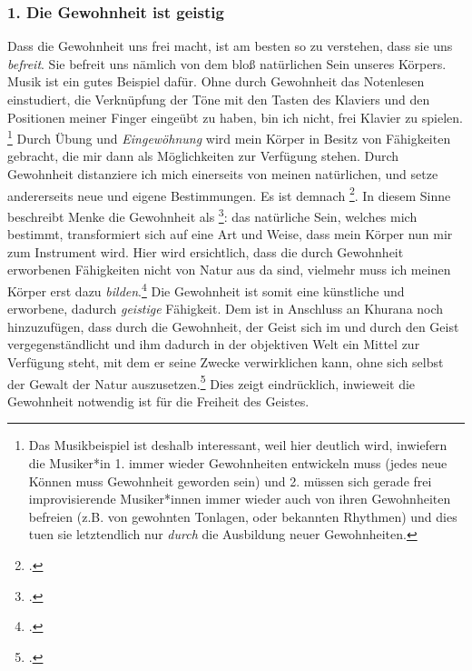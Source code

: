 \documentclass[12pt, a4paper, openany]{report}
\begin{document}
\subsubsection{1. Die Gewohnheit ist geistig}
Dass die Gewohnheit uns frei macht, ist am besten so zu verstehen, dass sie uns \emph{befreit}. 
Sie befreit uns nämlich von dem bloß natürlichen Sein unseres Körpers.
Musik ist ein gutes Beispiel dafür. 
Ohne durch Gewohnheit das Notenlesen einstudiert, die Verknüpfung der Töne mit den Tasten des Klaviers und den Positionen meiner Finger eingeübt zu haben, bin ich nicht, frei Klavier zu spielen.%
\footnote{
    Das Musikbeispiel ist deshalb interessant, weil hier deutlich wird, inwiefern die Musiker*in 1. immer wieder Gewohnheiten entwickeln muss (jedes neue Können muss Gewohnheit geworden sein) und 2. müssen sich gerade frei improvisierende Musiker*innen immer wieder auch von ihren Gewohnheiten befreien (z.B. von gewohnten Tonlagen, oder bekannten Rhythmen) und dies tuen sie letztendlich nur \emph{durch} die Ausbildung neuer Gewohnheiten.
}
Durch Übung und \emph{Eingewöhnung} wird mein Körper in Besitz von Fähigkeiten gebracht, die mir dann als Möglichkeiten zur Verfügung stehen.
Durch Gewohnheit distanziere ich mich einerseits von meinen natürlichen, und setze andererseits neue und eigene Bestimmungen. 
Es ist demnach \footcite[][§ 410 A, S. 185]{hegel_enzyklopädie_1969}.
In diesem Sinne beschreibt Menke die Gewohnheit als \footcite[][130]{menke_autonomie_2018}:
das natürliche Sein, welches mich bestimmt, transformiert sich auf eine Art und Weise, dass mein Körper nun mir zum Instrument wird.
Hier wird ersichtlich, dass die durch Gewohnheit erworbenen Fähigkeiten nicht von Natur aus da sind, vielmehr muss ich meinen Körper erst dazu \emph{bilden}.\footcite[Vgl.][§ 410 Z, S. 190]{hegel_enzyklopädie_1969}
Die Gewohnheit ist somit eine künstliche und erworbene, dadurch \emph{geistige} Fähigkeit.
Dem ist in Anschluss an Khurana noch hinzuzufügen, dass durch die Gewohnheit, der Geist sich im und durch den Geist vergegenständlicht und ihm dadurch in der objektiven Welt ein Mittel zur Verfügung steht, mit dem er seine Zwecke verwirklichen kann, ohne sich selbst der Gewalt der Natur auszusetzen.\footcite[Vgl.][426]{khurana_freiheit_2017}
Dies zeigt eindrücklich, inwieweit die Gewohnheit notwendig ist für die Freiheit des Geistes.
\end{document}
